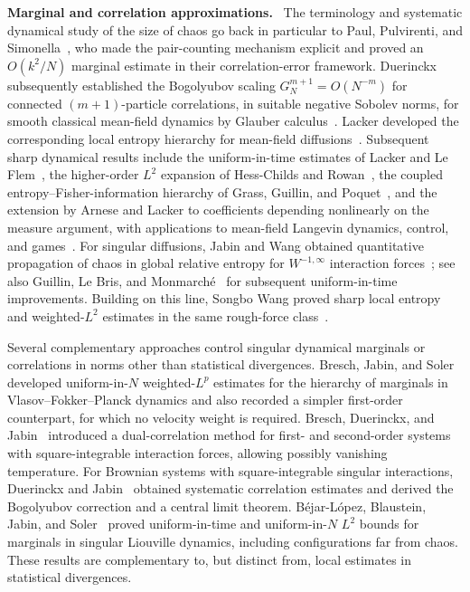 \documentclass[11pt,reqno]{amsart}
\numberwithin{equation}{section}
\theoremstyle{plain}
\theoremstyle{remark}
\newcommand{\parheading}[1]{\par\medskip\noindent\textbf{#1}\ }
\begin{document}
\parheading{Marginal and correlation approximations.}
The terminology and systematic dynamical study of the size of chaos go back in particular to Paul, Pulvirenti, and Simonella~\cite{PaulPulvirentiSimonella2019}, who made the pair-counting mechanism explicit and proved an \(O(k^2/N)\) marginal estimate in their correlation-error framework.  Duerinckx subsequently established the Bogolyubov scaling \(G_N^{m+1}=O(N^{-m})\) for connected \((m+1)\)-particle correlations, in suitable negative Sobolev norms, for smooth classical mean-field dynamics by Glauber calculus~\cite{DuerinckxGlauber2021}.  Lacker developed the corresponding local entropy hierarchy for mean-field diffusions~\cite{Lacker2023}.  Subsequent sharp dynamical results include the uniform-in-time estimates of Lacker and Le Flem~\cite{LackerLeFlem2023}, the higher-order \(L^2\) expansion of Hess-Childs and Rowan~\cite{HessChildsRowan2025}, the coupled entropy--Fisher-information hierarchy of Grass, Guillin, and Poquet~\cite{GrassGuillinPoquet2025}, and the extension by Arnese and Lacker to coefficients depending nonlinearly on the measure argument, with applications to mean-field Langevin dynamics, control, and games~\cite{ArneseLacker2026}.  For singular diffusions, Jabin and Wang obtained quantitative propagation of chaos in global relative entropy for \(W^{-1,\infty}\) interaction forces~\cite{JabinWang2018}; see also Guillin, Le Bris, and Monmarch\'{e}~\cite{GuillinLeBrisMonmarche2025} for subsequent uniform-in-time improvements.  Building on this line, Songbo Wang proved sharp local entropy and weighted-\(L^2\) estimates in the same rough-force class~\cite{Wang2026SharpLocal}.

Several complementary approaches control singular dynamical marginals or correlations in norms other than statistical divergences.  Bresch, Jabin, and Soler~\cite{BreschJabinSoler2025} developed uniform-in-\(N\) weighted-\(L^p\) estimates for the hierarchy of marginals in Vlasov--Fokker--Planck dynamics and also recorded a simpler first-order counterpart, for which no velocity weight is required.  Bresch, Duerinckx, and Jabin~\cite{BreschDuerinckxJabin2024} introduced a dual-correlation method for first- and second-order systems with square-integrable interaction forces, allowing possibly vanishing temperature.  For Brownian systems with square-integrable singular interactions, Duerinckx and Jabin~\cite{DuerinckxJabin2025Correlations} obtained systematic correlation estimates and derived the Bogolyubov correction and a central limit theorem.  B\'{e}jar-L\'{o}pez, Blaustein, Jabin, and Soler~\cite{BejarLopezBlausteinJabinSoler2026} proved uniform-in-time and uniform-in-\(N\) \(L^2\) bounds for marginals in singular Liouville dynamics, including configurations far from chaos.  These results are complementary to, but distinct from, local estimates in statistical divergences.
\end{document}
